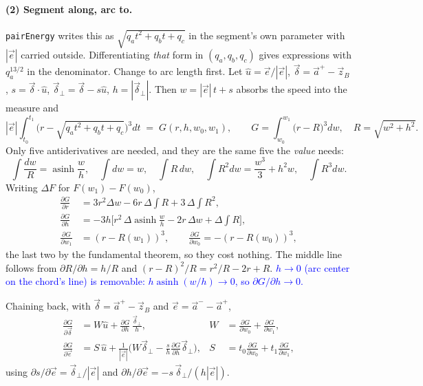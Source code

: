 \documentclass[11pt]{article}
\newcommand{\vv}[1]{\vec{#1}}
\newcommand{\code}[1]{\texttt{#1}}
\newcommand{\note}[1]{\textcolor{blue}{#1}}
\begin{document}
\paragraph{(2) Segment along, arc to.} \code{pairEnergy} writes this as
$\sqrt{q_at^2+q_bt+q_c}$ in the segment's own parameter with $|\vv e|$ carried outside.
Differentiating \emph{that} form in $(q_a,q_b,q_c)$ gives expressions with $q_a^{13/2}$ in the
denominator. Change to arc length first. Let $\hat u=\vv e/|\vv e|$, $\vv \delta=\vv a^+-\vv z_B$,
$s=\vv\delta\cdot\hat u$, $\vv\delta_\perp=\vv\delta-s\hat u$, $h=|\vv\delta_\perp|$. Then
$w=|\vv e|\,t+s$ absorbs the speed into the measure and
\begin{equation}
  |\vv e|\!\int_{t_0}^{t_1}\!\!\big(r-\sqrt{q_at^2+q_bt+q_c}\big)^3dt
  \;=\;G(r,h,w_0,w_1),\qquad
  G=\int_{w_0}^{w_1}\!\!\big(r-R\big)^3dw,\quad R=\sqrt{w^2+h^2}.
\end{equation}
Only five antiderivatives are needed, and they are the same five the \emph{value} needs:
\begin{equation}
  \int\!\frac{dw}{R}=\operatorname{asinh}\frac{w}{h},\quad
  \int\! dw=w,\quad
  \int\! R\,dw,\quad
  \int\! R^2dw=\frac{w^3}{3}+h^2w,\quad
  \int\! R^3dw .
\end{equation}
Writing $\Delta F$ for $F(w_1)-F(w_0)$,
\begin{align}
  \frac{\partial G}{\partial r}&=3r^2\Delta w-6r\,\Delta\!\!\int\! R+3\,\Delta\!\!\int\! R^2,\\
  \frac{\partial G}{\partial h}&=-3h\Big[r^2\,\Delta\operatorname{asinh}\tfrac{w}{h}-2r\,\Delta w+\Delta\!\!\int\! R\Big],\\
  \frac{\partial G}{\partial w_1}&=(r-R(w_1))^3,\qquad
  \frac{\partial G}{\partial w_0}=-(r-R(w_0))^3 ,
\end{align}
the last two by the fundamental theorem, so they cost nothing. The middle line follows from
$\partial R/\partial h=h/R$ and $(r-R)^2/R=r^2/R-2r+R$. \note{$h\to0$ (arc center on the chord's
line) is removable: $h\operatorname{asinh}(w/h)\to0$, so $\partial G/\partial h\to0$.}

Chaining back, with $\vv\delta=\vv a^+-\vv z_B$ and $\vv e=\vv a^--\vv a^+$,
\begin{align}
  \frac{\partial G}{\partial\vv\delta}&=W\hat u+\frac{\partial G}{\partial h}\,\frac{\vv\delta_\perp}{h},
  &W&=\frac{\partial G}{\partial w_0}+\frac{\partial G}{\partial w_1},\\
  \frac{\partial G}{\partial\vv e}&=S\,\hat u
  +\frac{1}{|\vv e|}\Big(W\vv\delta_\perp-\frac{s}{h}\frac{\partial G}{\partial h}\vv\delta_\perp\Big),
  &S&=t_0\frac{\partial G}{\partial w_0}+t_1\frac{\partial G}{\partial w_1},
\end{align}
using $\partial s/\partial\vv e=\vv\delta_\perp/|\vv e|$ and
$\partial h/\partial\vv e=-s\,\vv\delta_\perp/(h|\vv e|)$.
\end{document}

